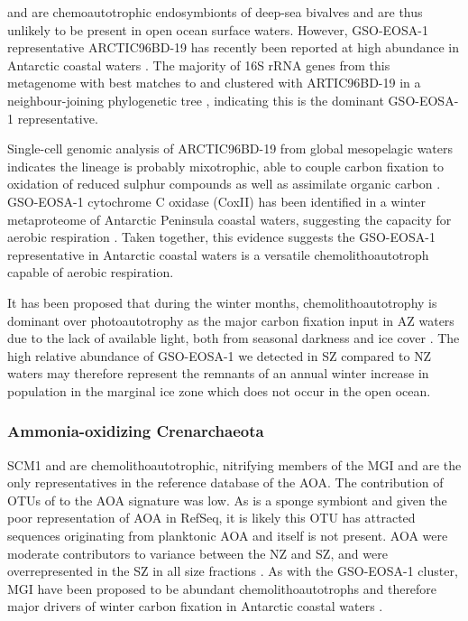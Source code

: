  and  are chemoautotrophic endosymbionts of deep-sea bivalves \cite{Kuwahara:2007gf,Newton:2007fu} and are thus unlikely to be present in open ocean surface waters. 
However, GSO-EOSA-1 representative ARCTIC96BD-19 has recently been reported at high abundance in Antarctic coastal waters \cite{Ghiglione:2011ee,Grzymski:2012ej}.
The majority of 16S rRNA genes from this metagenome with best  matches to  and  clustered with ARTIC96BD-19 in a neighbour-joining phylogenetic tree , indicating this is the dominant GSO-EOSA-1 representative. 

Single-cell genomic analysis of ARCTIC96BD-19 from global mesopelagic waters indicates the lineage is probably mixotrophic, able to couple carbon fixation to oxidation of reduced sulphur compounds as well as assimilate organic carbon \cite{Swan:2011hb}.
GSO-EOSA-1 cytochrome C oxidase (CoxII) has been identified in a winter metaproteome of Antarctic Peninsula coastal waters, suggesting the capacity for aerobic respiration \cite{Williams:2012bs}.
Taken together, this evidence suggests the GSO-EOSA-1 representative in Antarctic coastal waters is a versatile chemolithoautotroph capable of aerobic respiration.

It has been proposed that during the winter months, chemolithoautotrophy is dominant over photoautotrophy as the major carbon fixation input in \ac{AZ} waters due to the lack of available light, both from seasonal darkness and ice cover \cite{Grzymski:2012ej}.
The high relative abundance of GSO-EOSA-1 we detected in \ac{SZ} compared to \ac{NZ} waters may therefore represent the remnants of an annual winter increase in population in the marginal ice zone which does not occur in the open ocean.

\subsubsection{Ammonia-oxidizing Crenarchaeota}

 SCM1 and  are chemolithoautotrophic, nitrifying members of the \ac{MGI} \cite{Preston:1996vi,Walker:2010ww} and are the only representatives in the reference database of the \ac{AOA}.
The contribution of \acp{OTU} of  to the \ac{AOA} signature was low.
As  is a sponge symbiont \cite{Preston:1996vi} and given the poor representation of \ac{AOA} in RefSeq, it is likely this \ac{OTU} has attracted sequences originating from planktonic \ac{AOA} and  itself is not present.
\ac{AOA} were moderate contributors to variance between the \ac{NZ} and \ac{SZ}, and were overrepresented in the \ac{SZ} in all size fractions .
As with the GSO-EOSA-1 cluster, \ac{MGI} have been proposed to be abundant chemolithoautotrophs and therefore major drivers of winter carbon fixation in Antarctic coastal waters \cite{Grzymski:2012ej,Williams:2012bs}.

